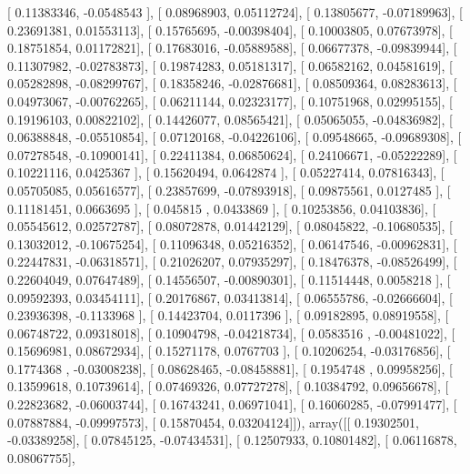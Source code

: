 \documentclass{article}
\begin{document}
       [ 0.11383346, -0.0548543 ],
       [ 0.08968903,  0.05112724],
       [ 0.13805677, -0.07189963],
       [ 0.23691381,  0.01553113],
       [ 0.15765695, -0.00398404],
       [ 0.10003805,  0.07673978],
       [ 0.18751854,  0.01172821],
       [ 0.17683016, -0.05889588],
       [ 0.06677378, -0.09839944],
       [ 0.11307982, -0.02783873],
       [ 0.19874283,  0.05181317],
       [ 0.06582162,  0.04581619],
       [ 0.05282898, -0.08299767],
       [ 0.18358246, -0.02876681],
       [ 0.08509364,  0.08283613],
       [ 0.04973067, -0.00762265],
       [ 0.06211144,  0.02323177],
       [ 0.10751968,  0.02995155],
       [ 0.19196103,  0.00822102],
       [ 0.14426077,  0.08565421],
       [ 0.05065055, -0.04836982],
       [ 0.06388848, -0.05510854],
       [ 0.07120168, -0.04226106],
       [ 0.09548665, -0.09689308],
       [ 0.07278548, -0.10900141],
       [ 0.22411384,  0.06850624],
       [ 0.24106671, -0.05222289],
       [ 0.10221116,  0.0425367 ],
       [ 0.15620494,  0.0642874 ],
       [ 0.05227414,  0.07816343],
       [ 0.05705085,  0.05616577],
       [ 0.23857699, -0.07893918],
       [ 0.09875561,  0.0127485 ],
       [ 0.11181451,  0.0663695 ],
       [ 0.045815  ,  0.0433869 ],
       [ 0.10253856,  0.04103836],
       [ 0.05545612,  0.02572787],
       [ 0.08072878,  0.01442129],
       [ 0.08045822, -0.10680535],
       [ 0.13032012, -0.10675254],
       [ 0.11096348,  0.05216352],
       [ 0.06147546, -0.00962831],
       [ 0.22447831, -0.06318571],
       [ 0.21026207,  0.07935297],
       [ 0.18476378, -0.08526499],
       [ 0.22604049,  0.07647489],
       [ 0.14556507, -0.00890301],
       [ 0.11514448,  0.0058218 ],
       [ 0.09592393,  0.03454111],
       [ 0.20176867,  0.03413814],
       [ 0.06555786, -0.02666604],
       [ 0.23936398, -0.1133968 ],
       [ 0.14423704,  0.0117396 ],
       [ 0.09182895,  0.08919558],
       [ 0.06748722,  0.09318018],
       [ 0.10904798, -0.04218734],
       [ 0.0583516 , -0.00481022],
       [ 0.15696981,  0.08672934],
       [ 0.15271178,  0.0767703 ],
       [ 0.10206254, -0.03176856],
       [ 0.1774368 , -0.03008238],
       [ 0.08628465, -0.08458881],
       [ 0.1954748 ,  0.09958256],
       [ 0.13599618,  0.10739614],
       [ 0.07469326,  0.07727278],
       [ 0.10384792,  0.09656678],
       [ 0.22823682, -0.06003744],
       [ 0.16743241,  0.06971041],
       [ 0.16060285, -0.07991477],
       [ 0.07887884, -0.09997573],
       [ 0.15870454,  0.03204124]]), array([[ 0.19302501, -0.03389258],
       [ 0.07845125, -0.07434531],
       [ 0.12507933,  0.10801482],
       [ 0.06116878,  0.08067755],
\end{document}
